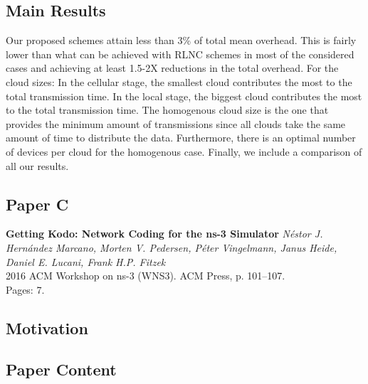 \subsection*{Main Results}
Our proposed schemes attain less than 3\% of total mean overhead. This is fairly lower than what can be achieved with \ac{RLNC} schemes in most of the considered cases and achieving at least 1.5-2X reductions in the total overhead. For the cloud sizes: In the cellular stage, the smallest cloud contributes the most to the total transmission time. In the local stage, the biggest cloud contributes the most to the total transmission time. The homogenous cloud size is the one that provides the minimum amount of transmissions since all clouds take the same amount of time to distribute the data. Furthermore, there is an optimal number of devices per cloud for the homogenous case. Finally, we include a comparison of all our results. 

\clearpage


\subsection{Paper C}
\textbf{Getting Kodo: Network Coding for the ns-3 Simulator}
\textit{N\'estor J. Hern\'andez Marcano, Morten V. Pedersen, P\'eter
Vingelmann, Janus Heide, Daniel E. Lucani, Frank H.P. Fitzek}
\\ 2016 ACM Workshop on ns-3 (WNS3). ACM Press, p. 101--107.
\\ Pages: 7.
\subsection*{Motivation}
 \subsection*{Paper Content}
